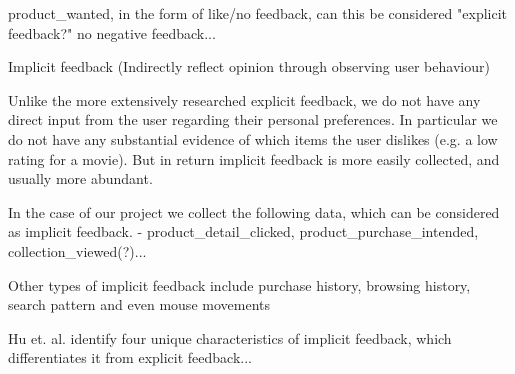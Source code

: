 product_wanted, in the form of like/no feedback, can this be considered "explicit feedback?" no negative feedback...

Implicit feedback (Indirectly reflect opinion through observing user behaviour)

Unlike the more extensively researched explicit feedback, we do not have any
direct input from the user regarding their personal preferences. In particular
we do not have any substantial evidence of which items the user dislikes (e.g. a
low rating for a movie). But in return implicit feedback is more easily
collected, and usually more abundant.

In the case of our project we collect the following data, which can be considered as implicit feedback.
- product\_detail\_clicked, product\_purchase\_intended, collection\_viewed(?)...

Other types of implicit feedback include purchase history, browsing
history, search pattern and even mouse movements

Hu et. al. \cite{Hu2008} identify four unique characteristics of implicit feedback, which differentiates it from explicit feedback...

